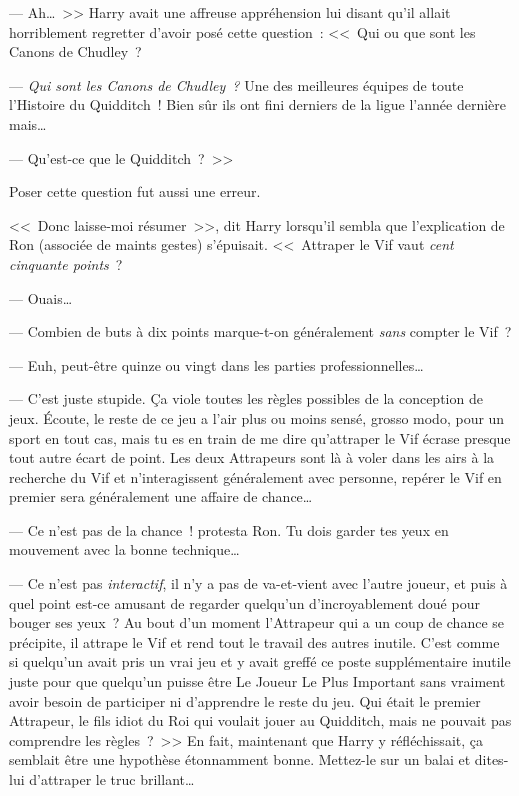 --- Ah…~>> Harry avait une affreuse appréhension lui disant qu'il allait horriblement regretter d'avoir posé cette question~: <<~Qui ou que sont les Canons de Chudley~?

--- \emph{Qui sont les Canons de Chudley~?} Une des meilleures équipes de toute l'Histoire du Quidditch~! Bien sûr ils ont fini derniers de la ligue l'année dernière mais…

--- Qu'est-ce que le Quidditch~?~>>

Poser cette question fut aussi une erreur.

<<~Donc laisse-moi résumer~>>, dit Harry lorsqu'il sembla que l'explication de Ron (associée de maints gestes) s'épuisait. <<~Attraper le Vif vaut \emph{cent cinquante points}~?

--- Ouais…

--- Combien de buts à dix points marque-t-on généralement \emph{sans} compter le Vif~?

--- Euh, peut-être quinze ou vingt dans les parties professionnelles…

--- C'est juste stupide. Ça viole toutes les règles possibles de la conception de jeux. Écoute, le reste de ce jeu a l'air plus ou moins sensé, grosso modo, pour un sport en tout cas, mais tu es en train de me dire qu'attraper le Vif écrase presque tout autre écart de point. Les deux Attrapeurs sont là à voler dans les airs à la recherche du Vif et n'interagissent généralement avec personne, repérer le Vif en premier sera généralement une affaire de chance…

--- Ce n'est pas de la chance~! protesta Ron. Tu dois garder tes yeux en mouvement avec la bonne technique…

--- Ce n'est pas \emph{interactif}, il n'y a pas de va-et-vient avec l'autre joueur, et puis à quel point est-ce amusant de regarder quelqu'un d'incroyablement doué pour bouger ses yeux~? Au bout d'un moment l'Attrapeur qui a un coup de chance se précipite, il attrape le Vif et rend tout le travail des autres inutile. C'est comme si quelqu'un avait pris un vrai jeu et y avait greffé ce poste supplémentaire inutile juste pour que quelqu'un puisse être Le Joueur Le Plus Important sans vraiment avoir besoin de participer ni d'apprendre le reste du jeu. Qui était le premier Attrapeur, le fils idiot du Roi qui voulait jouer au Quidditch, mais ne pouvait pas comprendre les règles~?~>> En fait, maintenant que Harry y réfléchissait, ça semblait être une hypothèse étonnamment bonne. Mettez-le sur un balai et dites-lui d'attraper le truc brillant…

